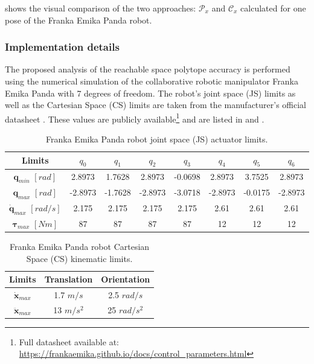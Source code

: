  shows the visual comparison of the two approaches: $\mathcal{P}_x$ and $\mathcal{C}_x$ calculated for one pose of the {Franka Emika Panda} robot. 

\subsubsection{Implementation details}

The proposed analysis of the reachable space polytope accuracy is performed using the numerical simulation of the collaborative robotic manipulator {Franka Emika Panda} with 7 degrees of freedom. The robot's joint space (JS) limits as well as the Cartesian Space (CS) limits are taken from the manufacturer's official datasheet \cite{franka_maual}. These values are publicly available\footnote{\label{note:franka}Full datasheet available at: \url{https://frankaemika.github.io/docs/control_parameters.html}} and are listed in  and .

\begin{table}[h!]
    \centering
    \begin{tabular}{|c|ccccccc|}
        \hline
        Limits & $q_0$ & $q_1$ & $q_2$ & $q_3$ & $q_4$ & $q_5$ & $q_6$ \\
        \hline
        ${\bm{q}}_{min}$ $[{rad}]$ & 2.8973 & 1.7628 & 2.8973 & -0.0698 & 2.8973 & 3.7525 & 2.8973\\
        ${\bm{q}}_{max}$ $[{rad}]$ & -2.8973 & -1.7628 & -2.8973 & -3.0718 & -2.8973 & -0.0175 & -2.8973\\
        $\dot{\bm{q}}_{max}$ $[{rad}/{s}]$ & 2.175 & 2.175 & 2.175 & 2.175 & 2.61 & 2.61 & 2.61 \\
        $\bm{\tau}_{max}$  $[Nm]$ & 87 & 87 & 87 & 87 & 12 & 12 & 12 \\
        \hline
    \end{tabular}
    \caption{Franka Emika Panda robot joint space (JS) actuator limits.}
    \label{tab:panda_limits_js_hfr}
\end{table}

	
\begin{table}[h]
    \centering
    \begin{tabular}{|c|cc|}
        \hline
        Limits & Translation & Orientation \\
        \hline
        $\dot{\bm{x}}_{max}$ & 1.7 $m/s$ & 2.5 $rad/s$ \\
        $\ddot{\bm{x}}_{max}$ & 13 $m/s^2$ & 25 $rad/s^{2}$\\
        \hline
    \end{tabular}
    \caption{Franka Emika Panda robot Cartesian Space (CS) kinematic limits.}
    \label{table:franka_limits_cs_hfr}
\end{table}




